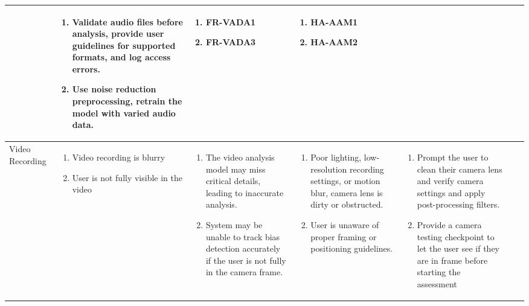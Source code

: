 \documentclass{article}
\begin{document}
\begin{landscape}
\begin{longtable}{|p{3cm}|p{3cm}|p{4cm}|p{4cm}|p{3cm}|p{2cm}|p{3cm}|}
\begin{enumerate}[leftmargin=*]
  \end{enumerate} &
  \begin{enumerate}[leftmargin=*]
       \item Validate audio files before analysis, provide user guidelines for supported formats, and log access errors.
       \item Use noise reduction preprocessing, retrain the model with varied audio data.
  \end{enumerate} &
  \begin{enumerate}[leftmargin=*]
       \item FR-VADA1
       \item FR-VADA3
  \end{enumerate} &
  \begin{enumerate}[leftmargin=*]
       \item HA-AAM1
       \item HA-AAM2
  \end{enumerate} \\
  \hline
  Video Recording & 
  \begin{enumerate}[leftmargin=*]
      \item Video recording is blurry
      \item User is not fully visible in the video
  \end{enumerate} & 
  \begin{enumerate}[leftmargin=*]
      \item The video analysis model may miss critical details, leading to inaccurate analysis.
      \item System may be unable to track bias detection accurately if the user is not fully in the camera frame.
  \end{enumerate} &
  \begin{enumerate}[leftmargin=*]
       \item Poor lighting, low-resolution recording settings, or motion blur, camera lens is dirty or obstructed.
       \item User is unaware of proper framing or positioning guidelines.
  \end{enumerate} &
  \begin{enumerate}[leftmargin=*]
       \item Prompt the user to clean their camera lens and verify camera settings and apply post-processing filters.
       \item Provide a camera testing checkpoint to let the user see if they are in frame before starting the assessment
  \end{enumerate} &

\end{longtable}
\end{landscape}
\end{document}
